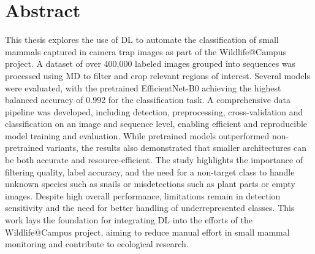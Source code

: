 

\vspace*{\fill}

\section*{Abstract}
\label{abstract}

This thesis explores the use of \ac{DL} to automate the classification of small mammals captured in camera trap images as part of the Wildlife@Campus project.
A dataset of over 400,000 labeled images grouped into sequences was processed using \acl{MD} to filter and crop relevant regions of interest.
Several models were evaluated, with the pretrained EfficientNet-B0 achieving the highest balanced accuracy of 0.992 for the classification task.
A comprehensive data pipeline was developed, including detection, preprocessing, cross-validation and classification on an image and sequence level, enabling efficient and reproducible model training and evaluation.
While pretrained models outperformed non-pretrained variants, the results also demonstrated that smaller architectures can be both accurate and resource-efficient.
The study highlights the importance of filtering quality, label accuracy, and the need for a non-target class to handle unknown species such as snails or misdetections such as plant parts or empty images.
Despite high overall performance, limitations remain in detection sensitivity and the need for better handling of underrepresented classes.
This work lays the foundation for integrating \ac{DL} into the efforts of the Wildlife@Campus project, aiming to reduce manual effort in small mammal monitoring and contribute to ecological research.

\vspace*{\fill}
